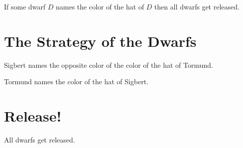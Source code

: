 \documentclass{stex}
\begin{document}
\begin{forthel}
  \begin{axiom}
    If some dwarf $D$ names the color of the hat of $D$ then all dwarfs get released.
  \end{axiom}
\end{forthel}


\section{The Strategy of the Dwarfs}

\begin{forthel}
  \begin{axiom}
    Sigbert names the opposite color of the color of the hat of Tormund.
  \end{axiom}
  \begin{axiom}
    Tormund names the color of the hat of Sigbert.
  \end{axiom}
\end{forthel}


\section{Release!}

\begin{forthel}
  \begin{theorem}
    All dwarfs get released.
  \end{theorem}
\end{forthel}
\end{document}
